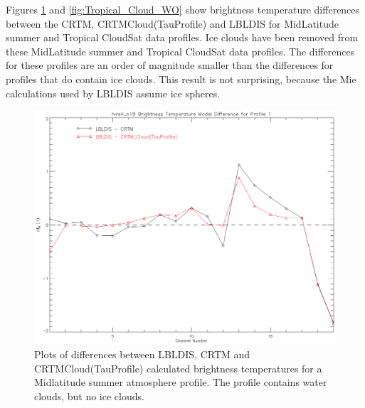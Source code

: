 \newpage{}
Figures \ref{fig:MidLat_Cloud_WO} and \ref{fig:Tropical_Cloud_WO} show brightness temperature differences between the CRTM, CRTM\textunderscore{}Cloud(TauProfile) and LBLDIS for MidLatitude summer and Tropical CloudSat data profiles. Ice clouds have been
removed from these MidLatitude summer and Tropical CloudSat data profiles. The differences for these profiles are an order of magnitude
smaller than the differences for profiles that do contain ice clouds. This result is not surprising, because the Mie calculations used by LBLDIS assume ice spheres.
\newpage{}
\begin{figure}[htp]
  \centering{}
  \includegraphics[scale=0.8]{./graphics/Midlatitude_Clouds_WO_01.eps}
  \caption{Plots of differences between LBLDIS, CRTM and CRTM\textunderscore{}Cloud(TauProfile) calculated brightness temperatures for 
   a Midlatitude summer atmosphere profile. The profile contains water clouds, but no ice clouds.}
  \label{fig:MidLat_Cloud_WO}
\end{figure}

